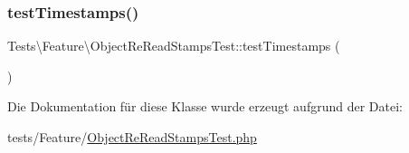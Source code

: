 \subsubsection{\texorpdfstring{test\+Timestamps()}{testTimestamps()}}
{\footnotesize\ttfamily Tests\textbackslash{}\+Feature\textbackslash{}\+Object\+Re\+Read\+Stamps\+Test\+::test\+Timestamps (\begin{DoxyParamCaption}{ }\end{DoxyParamCaption})}



Die Dokumentation für diese Klasse wurde erzeugt aufgrund der Datei\+:\begin{DoxyCompactItemize}
\item 
tests/\+Feature/\hyperlink{ObjectReReadStampsTest_8php}{Object\+Re\+Read\+Stamps\+Test.\+php}\end{DoxyCompactItemize}
